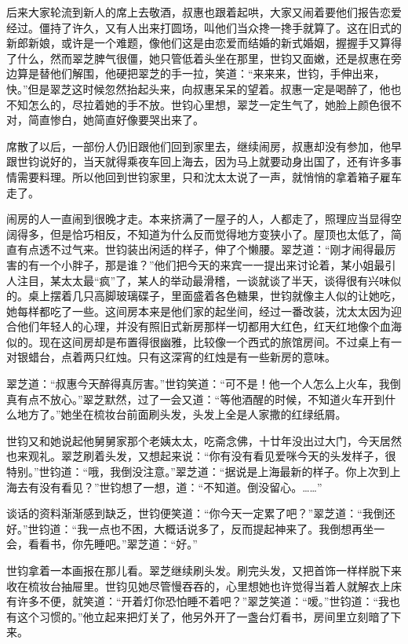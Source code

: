 \par 后来大家轮流到新人的席上去敬酒，叔惠也跟着起哄，大家又闹着要他们报告恋爱经过。僵持了许久，又有人出来打圆场，叫他们当众搀一搀手就算了。这在旧式的新郎新娘，或许是一个难题，像他们这是由恋爱而结婚的新式婚姻，握握手又算得了什么，然而翠芝脾气很僵，她只管低着头坐在那里，世钧又面嫩，还是叔惠在旁边算是替他们解围，他硬把翠芝的手一拉，笑道：“来来来，世钧，手伸出来，快。”但是翠芝这时候忽然抬起头来，向叔惠呆呆的望着。叔惠一定是喝醉了，他也不知怎么的，尽拉着她的手不放。世钧心里想，翠芝一定生气了，她脸上颜色很不对，简直惨白，她简直好像要哭出来了。
\par 席散了以后，一部份人仍旧跟他们回到家里去，继续闹房，叔惠却没有参加，他早跟世钧说好的，当天就得乘夜车回上海去，因为马上就要动身出国了，还有许多事情需要料理。所以他回到世钧家里，只和沈太太说了一声，就悄悄的拿着箱子雇车走了。
\par 闹房的人一直闹到很晚才走。本来挤满了一屋子的人，人都走了，照理应当显得空阔得多，但是恰巧相反，不知道为什么反而觉得地方变狭小了。屋顶也太低了，简直有点透不过气来。世钧装出闲适的样子，伸了个懒腰。翠芝道：“刚才闹得最厉害的有一个小胖子，那是谁？”他们把今天的来宾一一提出来讨论着，某小姐最引人注目，某太太最“疯”了，某人的举动最滑稽，一谈就谈了半天，谈得很有兴味似的。桌上摆着几只高脚玻璃碟子，里面盛着各色糖果，世钧就像主人似的让她吃，她每样都吃了一些。这间房本来是他们家的起坐间，经过一番改装，沈太太因为迎合他们年轻人的心理，并没有照旧式新房那样一切都用大红色，红天红地像个血海似的。现在这间房却是布置得很幽雅，比较像一个西式的旅馆房间。不过桌上有一对银蜡台，点着两只红烛。只有这深宵的红烛是有一些新房的意味。
\par 翠芝道：“叔惠今天醉得真厉害。”世钧笑道：“可不是！他一个人怎么上火车，我倒真有点不放心。”翠芝默然，过了一会又道：“等他酒醒的时候，不知道火车开到什么地方了。”她坐在梳妆台前面刷头发，头发上全是人家撒的红绿纸屑。
\par 世钧又和她说起他舅舅家那个老姨太太，吃斋念佛，十廿年没出过大门，今天居然也来观礼。翠芝刷着头发，又想起来说：“你有没有看见爱咪今天的头发样子，很特别。”世钧道：“哦，我倒没注意。”翠芝道：“据说是上海最新的样子。你上次到上海去有没有看见？”世钧想了一想，道：“不知道。倒没留心。……”
\par 谈话的资料渐渐感到缺乏，世钧便笑道：“你今天一定累了吧？”翠芝道：“我倒还好。”世钧道：“我一点也不困，大概话说多了，反而提起神来了。我倒想再坐一会，看看书，你先睡吧。”翠芝道：“好。”
\par 世钧拿着一本画报在那儿看。翠芝继续刷头发。刷完头发，又把首饰一样样脱下来收在梳妆台抽屉里。世钧见她尽管慢吞吞的，心里想她也许觉得当着人就解衣上床有许多不便，就笑道：“开着灯你恐怕睡不着吧？”翠芝笑道：“嗳。”世钧道：“我也有这个习惯的。”他立起来把灯关了，他另外开了一盏台灯看书，房间里立刻暗了下来。
